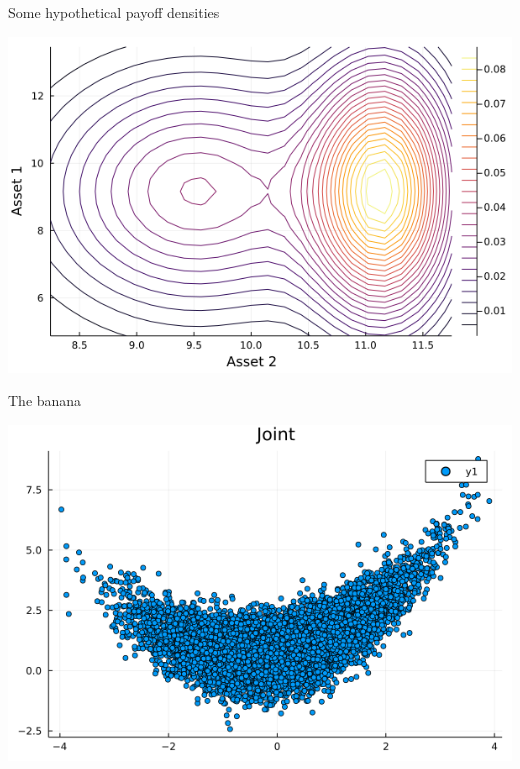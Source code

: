 \documentclass[
  ignorenonframetext,
]{beamer}
\begin{document}
\begin{frame}{Some hypothetical payoff densities}
\protect\hypertarget{some-hypothetical-payoff-densities}{}
\begin{center}\includegraphics[width=0.8\paperheight]{complexity_files/figure-beamer/unnamed-chunk-6-1} \end{center}
\end{frame}

\begin{frame}{The banana}
\protect\hypertarget{the-banana}{}
\begin{center}\includegraphics[width=0.5\paperheight]{complexity_files/figure-beamer/unnamed-chunk-7-1} \end{center}
\end{frame}
\end{document}
